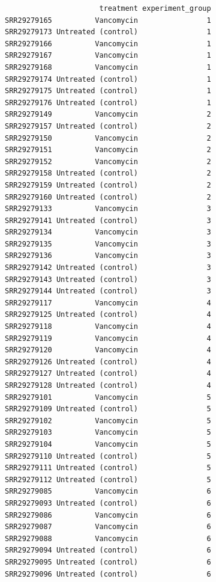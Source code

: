 \documentclass[
  letterpaper,
  DIV=11,
  numbers=noendperiod]{scrreprt}
\begin{document}
\begin{verbatim}
                      treatment experiment_group
SRR29279165          Vancomycin                1
SRR29279173 Untreated (control)                1
SRR29279166          Vancomycin                1
SRR29279167          Vancomycin                1
SRR29279168          Vancomycin                1
SRR29279174 Untreated (control)                1
SRR29279175 Untreated (control)                1
SRR29279176 Untreated (control)                1
SRR29279149          Vancomycin                2
SRR29279157 Untreated (control)                2
SRR29279150          Vancomycin                2
SRR29279151          Vancomycin                2
SRR29279152          Vancomycin                2
SRR29279158 Untreated (control)                2
SRR29279159 Untreated (control)                2
SRR29279160 Untreated (control)                2
SRR29279133          Vancomycin                3
SRR29279141 Untreated (control)                3
SRR29279134          Vancomycin                3
SRR29279135          Vancomycin                3
SRR29279136          Vancomycin                3
SRR29279142 Untreated (control)                3
SRR29279143 Untreated (control)                3
SRR29279144 Untreated (control)                3
SRR29279117          Vancomycin                4
SRR29279125 Untreated (control)                4
SRR29279118          Vancomycin                4
SRR29279119          Vancomycin                4
SRR29279120          Vancomycin                4
SRR29279126 Untreated (control)                4
SRR29279127 Untreated (control)                4
SRR29279128 Untreated (control)                4
SRR29279101          Vancomycin                5
SRR29279109 Untreated (control)                5
SRR29279102          Vancomycin                5
SRR29279103          Vancomycin                5
SRR29279104          Vancomycin                5
SRR29279110 Untreated (control)                5
SRR29279111 Untreated (control)                5
SRR29279112 Untreated (control)                5
SRR29279085          Vancomycin                6
SRR29279093 Untreated (control)                6
SRR29279086          Vancomycin                6
SRR29279087          Vancomycin                6
SRR29279088          Vancomycin                6
SRR29279094 Untreated (control)                6
SRR29279095 Untreated (control)                6
SRR29279096 Untreated (control)                6
\end{verbatim}
\end{document}
